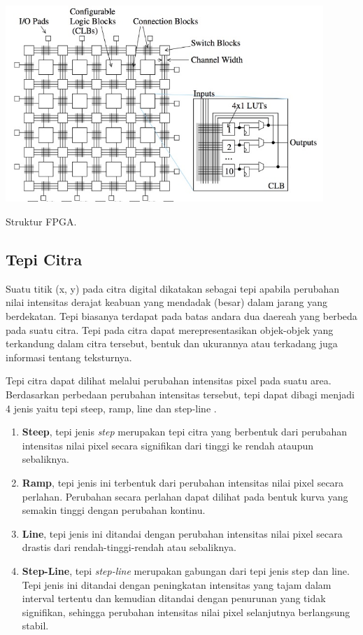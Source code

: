 \begin{afigure}
    \includegraphics[width=12cm, center]{images/fpga-structure.jpeg}
    \caption{Struktur FPGA.}
    \label{fig:fpga-structure}
\end{afigure}



\subsection{Tepi Citra}
Suatu titik (x, y) pada citra digital dikatakan sebagai tepi apabila perubahan nilai intensitas derajat keabuan yang mendadak (besar) dalam jarang yang berdekatan. Tepi biasanya terdapat pada batas andara dua daereah yang berbeda pada suatu citra. Tepi pada citra dapat merepresentasikan objek-objek yang terkandung dalam citra tersebut, bentuk dan ukurannya atau terkadang juga informasi tentang teksturnya.

Tepi citra dapat dilihat melalui perubahan intensitas pixel pada suatu area. Berdasarkan perbedaan perubahan intensitas tersebut, tepi dapat dibagi menjadi 4 jenis yaitu tepi steep, ramp, line dan step-line .

\begin{enumerate} [label=\textbf{\alph*.}]
    \item \textbf{Steep}, tepi jenis \textit{step} merupakan tepi citra yang berbentuk dari perubahan intensitas nilai pixel secara signifikan dari tinggi ke rendah ataupun sebaliknya.
    \item \textbf{Ramp}, tepi jenis ini terbentuk dari perubahan intensitas nilai pixel secara perlahan. Perubahan secara perlahan dapat dilihat pada bentuk kurva yang semakin tinggi dengan perubahan kontinu.
    \item \textbf{Line}, tepi jenis ini ditandai dengan perubahan intensitas nilai pixel secara drastis dari rendah-tinggi-rendah atau sebaliknya.
    \item \textbf{Step-Line}, tepi \textit{step-line} merupakan gabungan dari tepi jenis step dan line. Tepi jenis ini ditandai dengan peningkatan intensitas yang tajam dalam interval tertentu dan kemudian ditandai dengan penurunan yang tidak signifikan, sehingga perubahan intensitas nilai pixel selanjutnya berlangsung stabil.
\end{enumerate}

